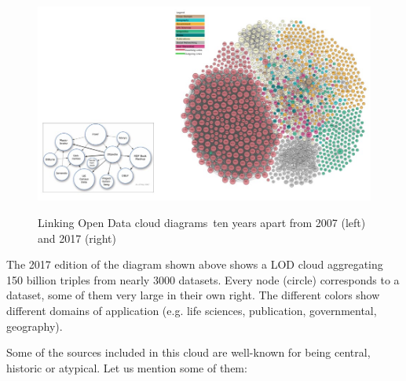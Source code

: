 \begin{figure}
\includegraphics[width=5.0in]{media/figure-05-14.jpg}
\label{fig:ch5.14}
\caption{Linking Open Data cloud diagrams\protect\footnotemark\ ten years apart from 2007 (left) and 2017 (right)}
\end{figure}

The 2017 edition of the diagram shown above shows a LOD cloud
aggregating 150 billion triples from nearly 3000 datasets. Every node
(circle) corresponds to a dataset, some of them very large in their own
right. The different colors show different domains of application (e.g.
life sciences, publication, governmental, geography).

Some of the sources included in this cloud are well-known for being
central, historic or atypical. Let us mention some of them:

